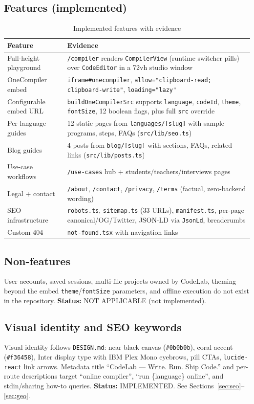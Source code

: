 \subsection{Features (implemented)}
\begin{table}[H]
\centering
\caption{Implemented features with evidence}
\begin{tabular}{|p{4cm}|p{8.5cm}|}
\hline
\textbf{Feature} & \textbf{Evidence} \\ \hline
Full-height playground & \texttt{/compiler} renders \texttt{CompilerView} (runtime switcher pills) over \texttt{CodeEditor} in a 72vh studio window \\ \hline
OneCompiler embed & \texttt{iframe\#onecompiler}, \texttt{allow="clipboard-read; clipboard-write"}, \texttt{loading="lazy"} \\ \hline
Configurable embed URL & \texttt{buildOneCompilerSrc} supports \texttt{language}, \texttt{codeId}, \texttt{theme}, \texttt{fontSize}, 12 boolean flags, plus full \texttt{src} override \\ \hline
Per-language guides & 12 static pages from \texttt{languages/[slug]} with sample programs, steps, FAQs (\texttt{src/lib/seo.ts}) \\ \hline
Blog guides & 4 posts from \texttt{blog/[slug]} with sections, FAQs, related links (\texttt{src/lib/posts.ts}) \\ \hline
Use-case workflows & \texttt{/use-cases} hub + students/teachers/interviews pages \\ \hline
Legal + contact & \texttt{/about}, \texttt{/contact}, \texttt{/privacy}, \texttt{/terms} (factual, zero-backend wording) \\ \hline
SEO infrastructure & \texttt{robots.ts}, \texttt{sitemap.ts} (33 URLs), \texttt{manifest.ts}, per-page canonical/OG/Twitter, JSON-LD via \texttt{JsonLd}, breadcrumbs \\ \hline
Custom 404 & \texttt{not-found.tsx} with navigation links \\ \hline
\end{tabular}
\end{table}

\subsection{Non-features}
User accounts, saved sessions, multi-file projects owned by CodeLab, theming beyond the embed \texttt{theme}/\texttt{fontSize} parameters, and offline execution do not exist in the repository. \textbf{Status:} NOT APPLICABLE (not implemented).

\subsection{Visual identity and SEO keywords}
Visual identity follows \texttt{DESIGN.md}: near-black canvas (\texttt{\#0b0b0b}), coral accent (\texttt{\#f36458}), Inter display type with IBM Plex Mono eyebrows, pill CTAs, \texttt{lucide-react} link arrows. Metadata title ``CodeLab --- Write. Run. Ship Code.'' and per-route descriptions target ``online compiler'', ``run \{language\} online'', and stdin/sharing how-to queries. \textbf{Status:} IMPLEMENTED. See Sections~\ref{sec:seo}--\ref{sec:geo}.
